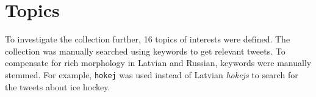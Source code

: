 \documentclass{IOS-Book-Article}
\makeatletter
\newcommand{\hl}[1]{#1}
\newcommand{\sn}[1]{\href{https://twitter.com/#1}{\texttt{@#1}}}
\makeatother
\begin{document}

%
%
%



\section{Topics}
\label{sec:topics}

To investigate the collection further, \hl{16} topics of interests were defined. The collection was manually searched using keywords to get relevant tweets. To compensate for rich morphology in Latvian and Russian, keywords were manually stemmed. For example, \texttt{hokej} was used instead of Latvian \textit{hokejs} to search for the tweets about ice hockey. 
\end{document}
